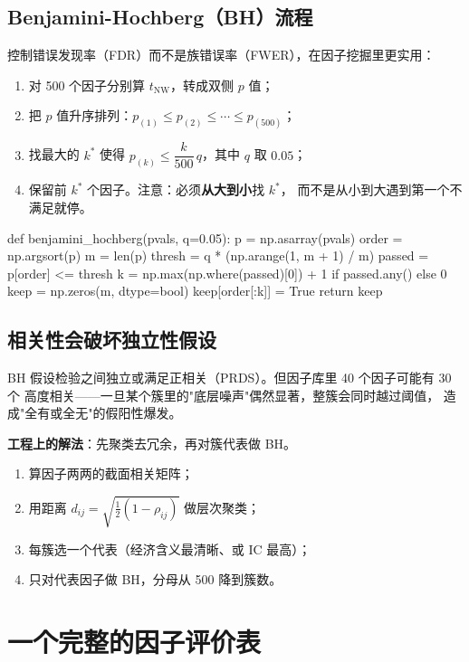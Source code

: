 \subsection{Benjamini-Hochberg（BH）流程}

控制错误发现率（FDR）而不是族错误率（FWER），在因子挖掘里更实用：

\begin{enumerate}
  \item 对 500 个因子分别算 $t_{\mathrm{NW}}$，转成双侧 $p$ 值；
  \item 把 $p$ 值升序排列：$p_{(1)} \le p_{(2)} \le \cdots \le p_{(500)}$；
  \item 找最大的 $k^*$ 使得 $p_{(k)} \le \dfrac{k}{500}\,q$，其中 $q$ 取 $0.05$；
  \item 保留前 $k^*$ 个因子。注意：必须\textbf{从大到小}找 $k^*$，
        而不是从小到大遇到第一个不满足就停。
\end{enumerate}

\begin{pycode}
def benjamini_hochberg(pvals, q=0.05):
    p = np.asarray(pvals)
    order = np.argsort(p)
    m = len(p)
    thresh = q * (np.arange(1, m + 1) / m)
    passed = p[order] <= thresh
    k = np.max(np.where(passed)[0]) + 1 if passed.any() else 0
    keep = np.zeros(m, dtype=bool)
    keep[order[:k]] = True
    return keep
\end{pycode}

\subsection{相关性会破坏独立性假设}

BH 假设检验之间独立或满足正相关（PRDS）。但因子库里 40 个因子可能有 30 个
高度相关——一旦某个簇里的"底层噪声"偶然显著，整簇会同时越过阈值，
造成"全有或全无"的假阳性爆发。

\textbf{工程上的解法}：先聚类去冗余，再对簇代表做 BH。

\begin{enumerate}
  \item 算因子两两的截面相关矩阵；
  \item 用距离 $d_{ij} = \sqrt{\tfrac12(1-\rho_{ij})}$ 做层次聚类；
  \item 每簇选一个代表（经济含义最清晰、或 IC 最高）；
  \item 只对代表因子做 BH，分母从 500 降到簇数。
\end{enumerate}

\section{一个完整的因子评价表}

